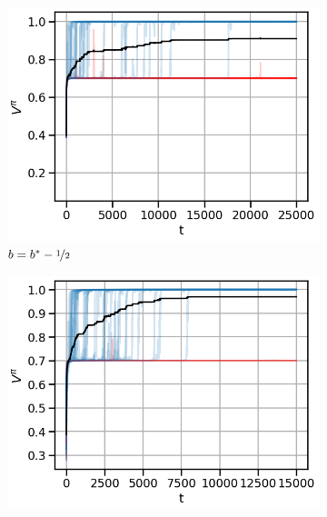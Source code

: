 \begin{figure}[!ht]
\centering
  \begin{subfigure}[b]{0.245\linewidth}
    \includegraphics[width=\textwidth]{articles/baselines/figs/appendix_figs_3arm_033/vanilla_minvar_-05_eta=05.png}
    \caption{$b = b^\ast - \nicefrac{1}{2}$}
  \end{subfigure}
    \begin{subfigure}[b]{0.245\linewidth}
    \includegraphics[width=\textwidth]{articles/baselines/figs/appendix_figs_3arm_033/vanilla_minvar_0_eta=05.png}

\end{subfigure}
\end{figure}
